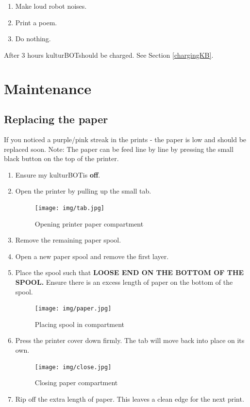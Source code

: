 \documentclass[]{article}
\newcommand{\kb}{kulturBOT}
\newcommand{\kbspace}{\kb \space}
\newcommand{\mykb}{my \kb}
\newcommand{\mykbspace}{\mykb \space}
\begin{document}
\begin{enumerate}
\item Make loud robot noises.
\item Print a poem.
\item Do nothing.
\end{enumerate}

After 3 hours \kbspace should be charged. See Section \ref{chargingKB}.

\section{Maintenance}
\subsection{Replacing the paper}
If you noticed a purple/pink streak in the prints - the paper is low and should be replaced soon. Note: The paper can be feed line by line by pressing the small black button on the top of the printer.
\begin{enumerate}
\item Ensure \mykbspace is \textbf{off}.
\item Open the printer by pulling up the small tab.
	\begin{figure}[h!]
		\centering
	    \texttt{[image: img/tab.jpg]}
	    \caption{Opening printer paper compartment}

	\end{figure}
\item Remove the remaining paper spool.
\item Open a new paper spool and remove the first layer.
\item Place the spool such that \textbf{LOOSE END ON THE BOTTOM OF THE SPOOL.} Ensure there is an excess length of paper on the bottom of the spool.
	\begin{figure}[h!]
		\centering
	    \texttt{[image: img/paper.jpg]}
	    \caption{Placing spool in compartment}

	\end{figure}
\item Press the printer cover down firmly. The tab will move back into place on its own.
	\begin{figure}[h!]
		\centering
	    \texttt{[image: img/close.jpg]}
	    \caption{Closing paper compartment}
	\end{figure}
\item Rip off the extra length of paper. This leaves a clean edge for the next print.
\end{enumerate}
\end{document}

